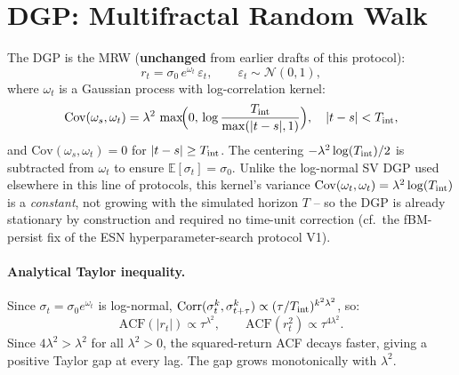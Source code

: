 \documentclass[11pt,a4paper]{article}
\begin{document}
\begin{abstract}
\begin{enumerate}
    \item \textbf{Model evaluation.} Compare the calibrated models according
    to their ability to reproduce the Taylor effect. Section~\ref{sec:taylor-results}
    presents the results and highlights two key observations:
    \begin{itemize}
        \item QRH and PDV-GL are calibrated independently of the ESN;
        \item PDV-GL systematically produces a weak Taylor gap for a
        structural, rather than calibration-related, reason.
    \end{itemize}
\end{enumerate}
\end{abstract}

\tableofcontents\vspace{0.4cm}

\section{DGP: Multifractal Random Walk}

The DGP is the MRW \cite{bacry2001} (\textbf{unchanged} from earlier
drafts of this protocol):
\begin{equation}
  r_t = \sigma_0\,e^{\omega_t}\,\varepsilon_t, \qquad
  \varepsilon_t \sim \mathcal{N}(0,1),
  \label{eq:mrw}
\end{equation}
where $\omega_t$ is a Gaussian process with log-correlation kernel:
\begin{equation}
  \mathrm{Cov}(\omega_s,\omega_t)
  = \lambda^2\,\max\!\Bigl(0,\,\log\frac{T_{\rm int}}{\max(|t-s|,1)}\Bigr),
  \quad |t-s| < T_{\rm int},
  \label{eq:cov}
\end{equation}
and $\mathrm{Cov}(\omega_s,\omega_t)=0$ for $|t-s|\ge T_{\rm int}$.
The centering $-\lambda^2\log(T_{\rm int})/2$ is subtracted from $\omega_t$
to ensure $\mathbb{E}[\sigma_t]=\sigma_0$. Unlike the log-normal SV DGP
used elsewhere in this line of protocols, this kernel's variance
$\mathrm{Cov}(\omega_t,\omega_t)=\lambda^2\log(T_{\rm int})$ is a
\emph{constant}, not growing with the simulated horizon $T$ -- so the
DGP is already stationary by construction and required no time-unit
correction (cf.\ the fBM-persist fix of the ESN hyperparameter-search
protocol V1).

\paragraph{Analytical Taylor inequality.}
Since $\sigma_t=\sigma_0 e^{\omega_t}$ is log-normal,
$\mathrm{Corr}(\sigma_t^k,\sigma_{t+\tau}^k)\propto(\tau/T_{\rm int})^{k^2\lambda^2}$,
so:
\begin{equation}
  \mathrm{ACF}(|r_t|)\propto\tau^{\lambda^2},\qquad
  \mathrm{ACF}(r_t^2)\propto\tau^{4\lambda^2}.
  \label{eq:taylor_proof}
\end{equation}
Since $4\lambda^2>\lambda^2$ for all $\lambda^2>0$, the squared-return ACF
decays faster, giving a positive Taylor gap at every lag.
The gap grows monotonically with $\lambda^2$.
\end{document}
